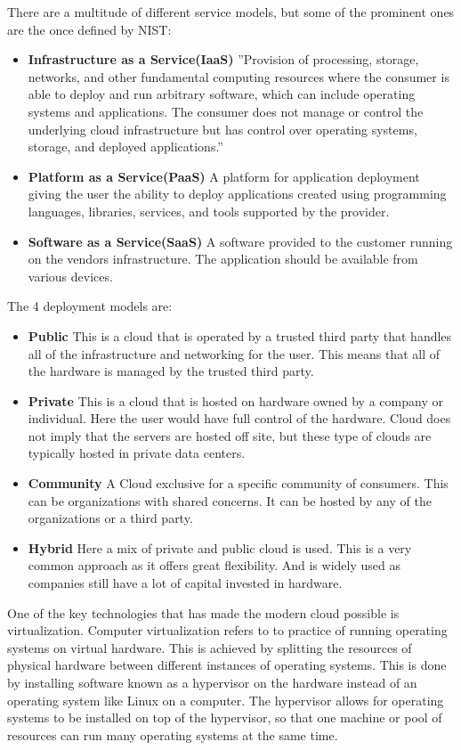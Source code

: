 \documentclass[]{uiophd}
\begin{document}
There are a multitude of different service models, but some of the prominent ones are the once defined by NIST:
\begin{itemize}
\item \textbf{Infrastructure as a Service(IaaS)} ''Provision of processing, storage, networks, and other fundamental computing resources where the consumer is able to deploy and run arbitrary software, which can include operating systems and applications. The consumer does not manage or control the underlying cloud infrastructure but has control over operating systems, storage, and deployed applications.''\cite{Mell:2011:SND:2206223}
\item \textbf{Platform as a Service(PaaS)} A platform for application deployment giving the user the ability to deploy applications created using programming languages, libraries, services, and tools supported by the provider.
\item \textbf{Software as a Service(SaaS)} A software provided to the customer running on the vendors infrastructure. The application should be available from various devices.
\end{itemize}

The 4 deployment models are:
\begin{itemize}
\item \textbf{Public} This is a cloud that is operated by a trusted third party that handles all of the infrastructure and networking for the user. This means that all of the hardware is managed by the trusted third party.
\item \textbf{Private} This is a cloud that is hosted on hardware owned by a company or individual. Here the user would have full control of the hardware. Cloud does not imply that the servers are hosted off site, but these type of clouds are typically hosted in private data centers.  
\item \textbf{Community} A Cloud exclusive for a specific community of consumers. This can be organizations with shared concerns. It can be hosted by any of the organizations or a third party. 
\item \textbf{Hybrid} Here a mix of private and public cloud is used. This is a very common approach as it offers great flexibility. And is widely used as companies still have a lot of capital invested in hardware.
\end{itemize}
 
One of the key technologies that has made the modern cloud possible is virtualization. Computer virtualization refers to to practice of running operating systems on virtual hardware. This is achieved by splitting the resources of physical hardware between different instances of operating systems. This is done by installing software known as a hypervisor on the hardware instead of an operating system like Linux on a computer. The hypervisor allows for operating systems to be installed on top of the hypervisor, so that one machine or pool of resources can run many operating systems at the same time.\cite{1430631}
\end{document}

